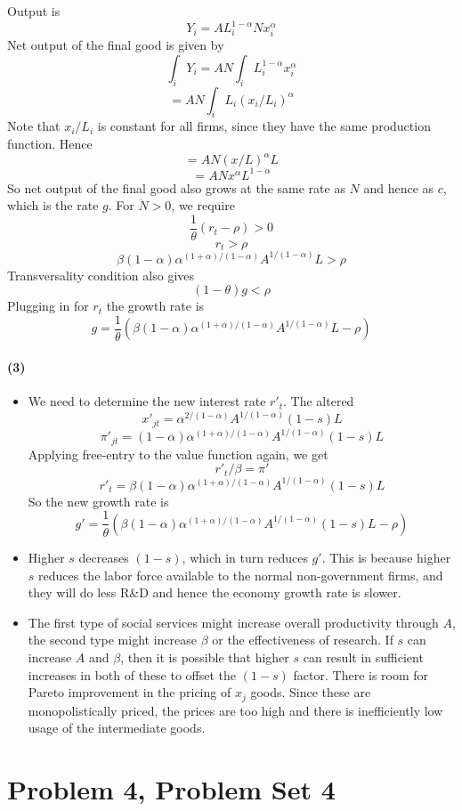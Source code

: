 \documentclass[10pt,letter]{article}
\newcommand{\problem}[1]{\section*{Problem #1}}
\newcommand{\problempart}[1]{\paragraph{#1}}
\begin{document}
Output is
\[ Y_i = AL_i^{1-\alpha} N x_i^\alpha \]
Net output of the final good is given by
\[ \int_i Y_i = AN \int_i L_i^{1-\alpha} x_i^\alpha \]
\[ = AN \int_i L_i (x_i/L_i)^\alpha \]
Note that $x_i/L_i$ is constant for all firms, since they have the same production function. Hence
\[ = AN \left(x/L\right)^\alpha L \]
\[ = AN x^\alpha L^{1-\alpha} \]
So net output of the final good also grows at the same rate as $N$ and hence as $c$, which is the rate $g$. For $\dot{N} > 0$, we require
\[ \frac{1}{\theta}(r_t-\rho) > 0\]
\[ r_t > \rho \]
\[ \beta(1-\alpha)\alpha^{(1+\alpha)/(1-\alpha)}A^{1/(1-\alpha)}L  > \rho \]
Transversality condition also gives
\[ (1-\theta)g < \rho \]
Plugging in for $r_t$ the growth rate is
\[ g = \frac{1}{\theta}\left(\beta(1-\alpha)\alpha^{(1+\alpha)/(1-\alpha)}A^{1/(1-\alpha)}L-\rho\right) \]
\problempart{(3)}
\begin{itemize}
  \item We need to determine the new interest rate $r'_t$. The altered
  \[ x'_{jt} = \alpha^{2/(1-\alpha)}A^{1/(1-\alpha)}(1-s)L \]
  \[ \pi'_{jt} = (1-\alpha)\alpha^{(1+\alpha)/(1-\alpha)}A^{1/(1-\alpha)}(1-s)L \]
  Applying free-entry to the value function again, we get
  \[ r'_t/\beta = \pi'  \]
  \[ r'_t = \beta (1-\alpha)\alpha^{(1+\alpha)/(1-\alpha)}A^{1/(1-\alpha)}(1-s)L \]
  So the new growth rate is
  \[ g' = \frac{1}{\theta}\left(  \beta (1-\alpha)\alpha^{(1+\alpha)/(1-\alpha)}A^{1/(1-\alpha)}(1-s)L  - \rho \right) \]

  \item Higher $s$ decreases $(1-s)$, which in turn reduces $g'$. This is because higher $s$ reduces the labor force available to the normal non-government firms, and they will do less R\&D and hence the economy growth rate is slower.
  \item The first type of social services might increase overall productivity through $A$, the second type might increase $\beta$ or the effectiveness of research. If $s$ can increase $A$ and $\beta$, then it is possible that higher $s$ can result in sufficient increases in both of these to offset the $(1-s)$ factor. There is room for Pareto improvement in the pricing of $x_j$ goods. Since these are monopolistically priced, the prices are too high and there is inefficiently low usage of the intermediate goods.
\end{itemize}
\pagebreak
\problem{4, Problem Set 4}
\end{document}
